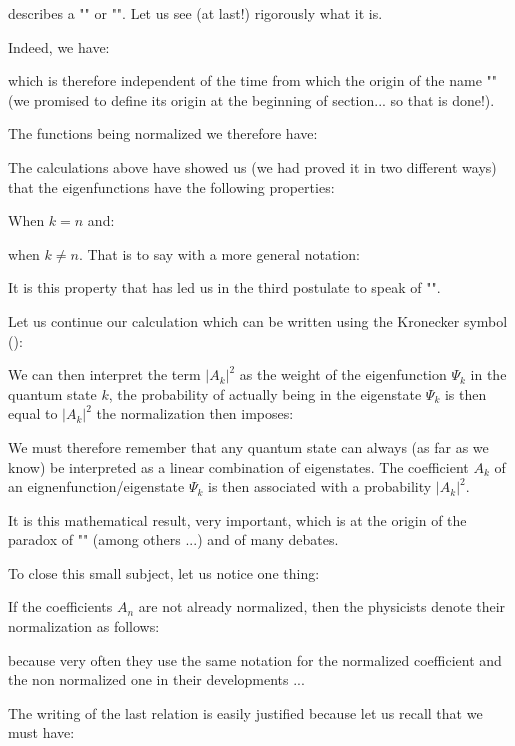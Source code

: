 	describes a "" or "". Let us see (at last!) rigorously what it is.

	Indeed, we have:
	
	which is therefore independent of the time from which the origin of the name "" (we promised to define its origin at the beginning of section... so that is done!).

	The functions being normalized we therefore have:
	
	The calculations above have showed us (we had proved it in two different ways) that the eigenfunctions have the following properties:
	
	When $k=n$ and:
	
	when $k\neq n$. That is to say with a more general notation:
	
	It is this property that has led us in the third postulate to speak of "".
	
	Let us continue our calculation which can be written using the Kronecker symbol ():
	
	We can then interpret the term $|A_k|^2$ as the weight of the eigenfunction $\Psi_k$ in the quantum state $k$, the probability of actually being in the eigenstate $\Psi_k$ is then equal to $|A_k|^2$ the normalization then imposes:
	
	We must therefore remember that any quantum state can always (as far as we know) be interpreted as a linear combination of eigenstates. The coefficient $A_k$ of an eignenfunction/eigenstate $\Psi_k$ is then associated with a probability $|A_k|^2$.
	
	It is this mathematical result, very important, which is at the origin of the paradox of "" (among others ...) and of many debates.

	To close this small subject, let us notice one thing:

	If the coefficients $A_n$ are not already normalized, then the physicists denote their normalization as follows:
	
	because very often they use the same notation for the normalized coefficient and the non normalized one in their developments ...

The writing of the last relation is easily justified because let us recall that we must have:
	
